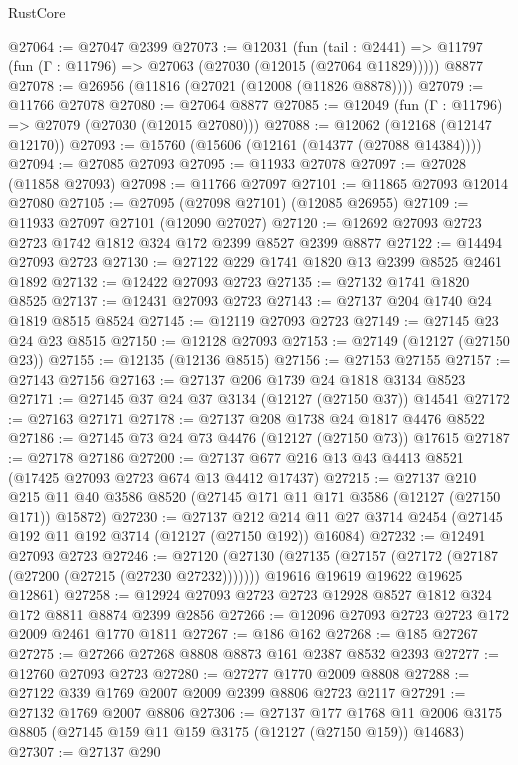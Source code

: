 \begin{lexlean}{RustCore}
\begin{coremodule}
@27064 := @27047 @2399
@27073 := @12031
    (fun (tail : @2441) => @11797 (fun (Γ : @11796) => @27063 (@27030 (@12015 (@27064 @11829)))))
    @8877
@27078 := @26956 (@11816 (@27021 (@12008 (@11826 @8878))))
@27079 := @11766 @27078
@27080 := @27064 @8877
@27085 := @12049 (fun (Γ : @11796) => @27079 (@27030 (@12015 @27080)))
@27088 := @12062 (@12168 (@12147 @12170))
@27093 := @15760 (@15606 (@12161 (@14377 (@27088 @14384))))
@27094 := @27085 @27093
@27095 := @11933 @27078
@27097 := @27028 (@11858 @27093)
@27098 := @11766 @27097
@27101 := @11865 @27093 @12014 @27080
@27105 := @27095 (@27098 @27101) (@12085 @26955)
@27109 := @11933 @27097 @27101 (@12090 @27027)
@27120 := @12692 @27093 @2723 @2723 @1742 @1812 @324 @172 @2399 @8527 @2399 @8877
@27122 := @14494 @27093 @2723
@27130 := @27122 @229 @1741 @1820 @13 @2399 @8525 @2461 @1892
@27132 := @12422 @27093 @2723
@27135 := @27132 @1741 @1820 @8525
@27137 := @12431 @27093 @2723
@27143 := @27137 @204 @1740 @24 @1819 @8515 @8524
@27145 := @12119 @27093 @2723
@27149 := @27145 @23 @24 @23 @8515
@27150 := @12128 @27093
@27153 := @27149 (@12127 (@27150 @23))
@27155 := @12135 (@12136 @8515)
@27156 := @27153 @27155
@27157 := @27143 @27156
@27163 := @27137 @206 @1739 @24 @1818 @3134 @8523
@27171 := @27145 @37 @24 @37 @3134 (@12127 (@27150 @37)) @14541
@27172 := @27163 @27171
@27178 := @27137 @208 @1738 @24 @1817 @4476 @8522
@27186 := @27145 @73 @24 @73 @4476 (@12127 (@27150 @73)) @17615
@27187 := @27178 @27186
@27200 := @27137 @677 @216 @13 @43 @4413 @8521 (@17425 @27093 @2723 @674 @13 @4412 @17437)
@27215 := @27137
    @210
    @215
    @11
    @40
    @3586
    @8520
    (@27145 @171 @11 @171 @3586 (@12127 (@27150 @171)) @15872)
@27230 := @27137
    @212
    @214
    @11
    @27
    @3714
    @2454
    (@27145 @192 @11 @192 @3714 (@12127 (@27150 @192)) @16084)
@27232 := @12491 @27093 @2723
@27246 := @27120
    (@27130
      (@27135 (@27157 (@27172 (@27187 (@27200 (@27215 (@27230 @27232)))))))
      @19616
      @19619
      @19622
      @19625
      @12861)
@27258 := @12924 @27093 @2723 @2723 @12928 @8527 @1812 @324 @172 @8811 @8874 @2399 @2856
@27266 := @12096 @27093 @2723 @2723 @172 @2009 @2461 @1770 @1811
@27267 := @186 @162
@27268 := @185 @27267
@27275 := @27266 @27268 @8808 @8873 @161 @2387 @8532 @2393
@27277 := @12760 @27093 @2723
@27280 := @27277 @1770 @2009 @8808
@27288 := @27122 @339 @1769 @2007 @2009 @2399 @8806 @2723 @2117
@27291 := @27132 @1769 @2007 @8806
@27306 := @27137
    @177
    @1768
    @11
    @2006
    @3175
    @8805
    (@27145 @159 @11 @159 @3175 (@12127 (@27150 @159)) @14683)
@27307 := @27137 @290

\end{coremodule}
\end{lexlean}
